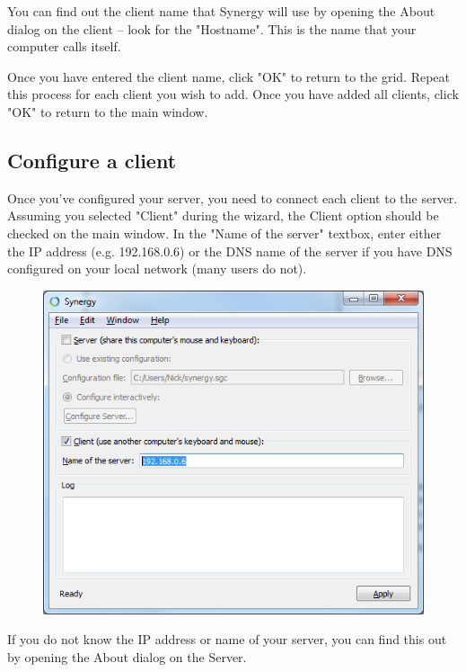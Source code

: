 You can find out the client name that Synergy will use by opening
the About dialog on the client -- look for the "Hostname". This is the
name that your computer calls itself.

Once you have entered the client name, click "OK" to return to the grid.
Repeat this process for each client you wish to add. Once you have added
all clients, click "OK" to return to the main window.

\applyhint{}

\subsection{Configure a client}

Once you've configured your server, you need to connect each client to
the server. Assuming you selected "Client" during the wizard, the Client
option should be checked on the main window. In the "Name of the server"
textbox, enter either the IP address (e.g. 192.168.0.6) or the DNS name
of the server if you have DNS configured on your local network (many
users do not).

\begin{figure}[H]
\includegraphics[scale=.75]{graphics/windows-client.png}
\end{figure}

If you do not know the IP address or name of your server, you can find
this out by opening the About dialog on the Server.

\applyhint{}
